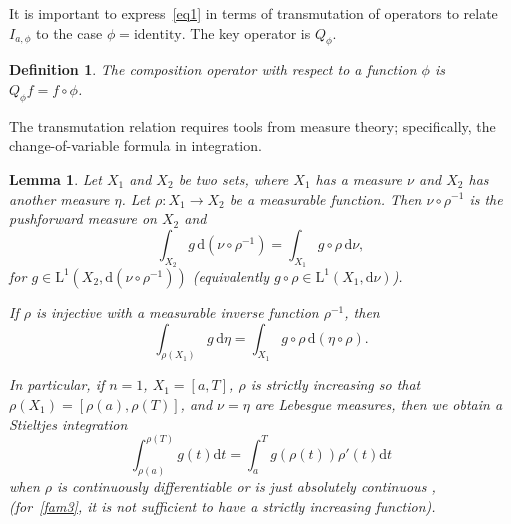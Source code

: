 \documentclass[12pt,reqno]{amsart}
\theoremstyle{plain}
\newtheorem{lemma}[theorem]{Lemma} %
\newtheorem{definition}[theorem]{Definition}
\numberwithin{equation}{section} %
\begin{document}
It is important to express~\eqref{eq1} in terms of transmutation of operators to relate $I_{a,\phi}$ to the case $\phi=\text{identity}$. The key operator is $Q_\phi$.

\begin{definition} \label{def3}
The composition operator with respect to a function $\phi$ is $Q_\phi f=f\circ \phi$.
\end{definition}

The transmutation relation requires tools from measure theory; specifically, the change-of-variable formula in integration.

\begin{lemma} \label{lemMe}
Let $X_1$ and $X_2$ be two sets, where $X_1$ has a measure $\nu$ and $X_2$ has another measure $\eta$. Let $\rho:X_1\rightarrow X_2$ be a measurable function. Then $\nu\circ \rho^{-1}$ is the pushforward measure on $X_2$ and 
\begin{equation} \int_{X_2} g\,\mathrm{d}(\nu\circ \rho^{-1})=\int_{X_1} g\circ \rho\, \mathrm{d}\nu, \label{fam1} \end{equation}
for $g\in \mathrm{L}^1(X_2,\mathrm{d}(\nu\circ\rho^{-1}))$ (equivalently $g\circ\rho\in\mathrm{L}^1(X_1,\mathrm{d}\nu)$). \cite[Theorem~3.6.1]{boga}

If $\rho$ is injective with a measurable inverse function $\rho^{-1}$, then
\begin{equation} \int_{\rho(X_1)} g\,\mathrm{d}\eta=\int_{X_1}g\circ \rho\,\mathrm{d}(\eta\circ \rho). \label{fam2} \end{equation}

In particular, if $n=1$, $X_1=[a,T]$, $\rho$ is strictly increasing so that $\rho(X_1)=[\rho(a),\rho(T)]$, and $\nu=\eta$ are Lebesgue measures, then we obtain a Stieltjes integration
\begin{equation} \int_{\rho(a)}^{\rho(T)} g(t)\mathrm{d}t=\int_a^T g(\rho(t))\rho'(t)\mathrm{d}t \label{fam3} \end{equation}
when $\rho$ is continuously differentiable or is just absolutely continuous \cite[Theorem~3.7.1]{boga}, \cite[Theorem~7.26]{rudin} (for~\eqref{fam3}, it is not sufficient to have a strictly increasing function).
\end{lemma}
\end{document}
